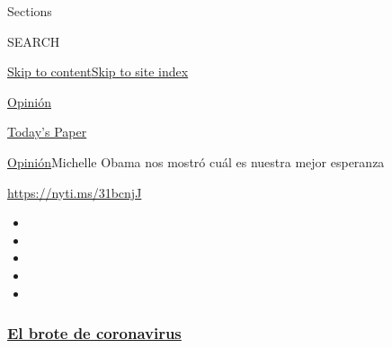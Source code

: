 Sections

SEARCH

\protect\hyperlink{site-content}{Skip to
content}\protect\hyperlink{site-index}{Skip to site index}

\href{https://www.nytimes3xbfgragh.onion/es/section/opinion}{Opinión}

\href{https://myaccount.nytimes3xbfgragh.onion/auth/login?response_type=cookie\&client_id=vi}{}

\href{https://www.nytimes3xbfgragh.onion/section/todayspaper}{Today's
Paper}

\href{/es/section/opinion}{Opinión}\textbar{}Michelle Obama nos mostró
cuál es nuestra mejor esperanza

\url{https://nyti.ms/31bcnjJ}

\begin{itemize}
\item
\item
\item
\item
\item
\end{itemize}

\hypertarget{el-brote-de-coronavirus}{%
\subsubsection{\texorpdfstring{\href{https://www.nytimes3xbfgragh.onion/es/spotlight/coronavirus?name=styln-coronavirus-es\&region=TOP_BANNER\&variant=undefined\&block=storyline_menu_recirc\&action=click\&pgtype=Article\&impression_id=12b121f0-e387-11ea-8198-d359754c6cb2}{El
brote de
coronavirus}}{El brote de coronavirus}}\label{el-brote-de-coronavirus}}

